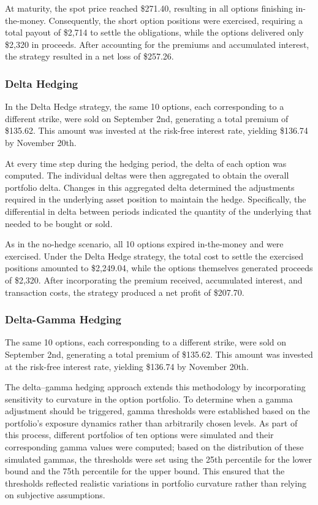\documentclass{article}
\begin{document}
At maturity, the spot price reached \$271.40, resulting in all options finishing in-the-money. Consequently, the short option positions were exercised, requiring a total payout of \$2,714 to settle the obligations, while the options delivered only \$2,320 in proceeds. After accounting for the premiums and accumulated interest, the strategy resulted in a net loss of \$257.26.

\subsubsection{Delta Hedging}

In the Delta Hedge strategy, the same 10 options, each corresponding to a different strike, were sold on September 2nd, generating a total premium of \$135.62. This amount was invested at the risk-free interest rate, yielding \$136.74 by November 20th.

At every time step during the hedging period, the delta of each option was computed. The individual deltas were then aggregated to obtain the overall portfolio delta. Changes in this aggregated delta determined the adjustments required in the underlying asset position to maintain the hedge. Specifically, the differential in delta between periods indicated the quantity of the underlying that needed to be bought or sold.

As in the no-hedge scenario, all 10 options expired in-the-money and were exercised. Under the Delta Hedge strategy, the total cost to settle the exercised positions amounted to \$2,249.04, while the options themselves generated proceeds of \$2,320. After incorporating the premium received, accumulated interest, and transaction costs, the strategy produced a net profit of \$207.70.

\subsubsection{Delta-Gamma Hedging}

The same 10 options, each corresponding to a different strike, were sold on September 2nd, generating a total premium of \$135.62. This amount was invested at the risk-free interest rate, yielding \$136.74 by November 20th.

The delta–gamma hedging approach extends this methodology by incorporating sensitivity to curvature in the option portfolio. To determine when a gamma adjustment should be triggered, gamma thresholds were established based on the portfolio’s exposure dynamics rather than arbitrarily chosen levels. As part of this process, different portfolios of ten options were simulated and their corresponding gamma values were computed; based on the distribution of these simulated gammas, the thresholds were set using the 25th percentile for the lower bound and the 75th percentile for the upper bound. This ensured that the thresholds reflected realistic variations in portfolio curvature rather than relying on subjective assumptions.
\end{document}
